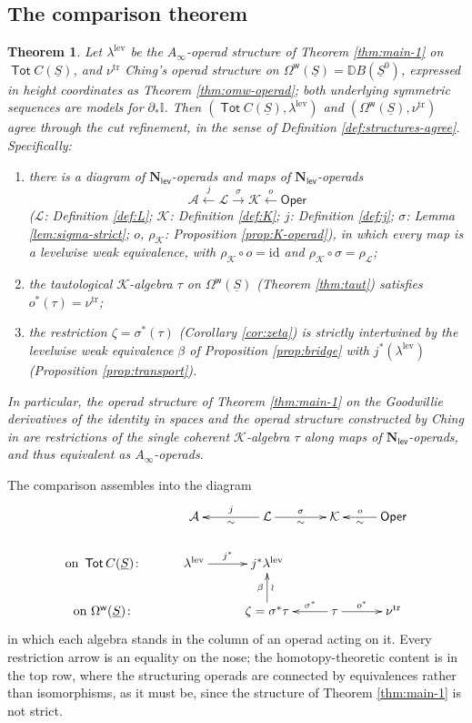 \documentclass[12pt]{amsart}
\newtheorem{theorem}[subsection]{Theorem}
\theoremstyle{definition}
\theoremstyle{remark}
\newcommand{\Tot}{\operatorname{\mathsf{Tot}}}
\newcommand{\Oper}{\mathsf{Oper}}
\newcommand{\id}{\mathrm{id}}
\newcommand{\Id}{\mathbb{I}}
\newcommand{\Nl}{\mathbf{N}_{\mathsf{lev}}}
\newcommand{\uS}{\underline{S}}
\newcommand{\uSz}{\uS^{0}}                       %
\newcommand{\Omw}{\Omega^{\mathsf{w}}}           %
\newcommand{\Kop}{\mathcal{K}}                   %
\newcommand{\Lop}{\mathcal{L}}                   %
\newcommand{\Aop}{\mathcal{A}}                   %
\begin{document}
\subsection{The comparison theorem}\label{sec:main}

\begin{theorem}\label{thm:main}
Let $\lambda^{\mathrm{lev}}$ be the $A_\infty$-operad structure of Theorem \ref{thm:main-1} on $\Tot C(\uS)$, and $\nu^{\mathrm{tr}}$ Ching's operad structure \cite[\S\S 4--8]{Ching-thesis} on $\Omw(\uS) = \mathbb{D}B(\uSz)$, expressed in height coordinates as Theorem \ref{thm:omw-operad}; both underlying symmetric sequences are models for $\partial_*\Id$. Then $(\Tot C(\uS), \lambda^{\mathrm{lev}})$ and $(\Omw(\uS), \nu^{\mathrm{tr}})$ agree through the cut refinement, in the sense of Definition \ref{def:structures-agree}. Specifically:
\begin{enumerate}[label=(\arabic*)]
    \item there is a diagram of $\Nl$-operads and maps of $\Nl$-operads
    \[ \Aop \xleftarrow{\ j\ } \Lop \xrightarrow{\ \sigma\ } \Kop \xleftarrow{\ o\ } \Oper\]
    ($\Lop$: Definition \ref{def:L}; $\Kop$: Definition \ref{def:K}; $j$: Definition \ref{def:j}; $\sigma$: Lemma \ref{lem:sigma-strict}; $o$, $\rho_\Kop$: Proposition \ref{prop:K-operad}), in which every map is a levelwise weak equivalence, with $\rho_\Kop\circ o = \id$ and $\rho_\Kop\circ\sigma = \rho_\Lop$;
    \item the tautological $\Kop$-algebra $\tau$ on $\Omw(\uS)$ (Theorem \ref{thm:taut}) satisfies $o^{*}(\tau) = \nu^{\mathrm{tr}}$;
    \item the restriction $\zeta = \sigma^{*}(\tau)$ (Corollary \ref{cor:zeta}) is strictly intertwined by the levelwise weak equivalence $\beta$ of Proposition \ref{prop:bridge} with $j^{*}(\lambda^{\mathrm{lev}})$ (Proposition \ref{prop:transport}).
\end{enumerate}
In particular, the operad structure of Theorem \ref{thm:main-1} on the Goodwillie derivatives of the identity in spaces and the operad structure constructed by Ching in \cite{Ching-thesis} are restrictions of the single coherent $\Kop$-algebra $\tau$ along maps of $\Nl$-operads, and thus equivalent as $A_\infty$-operads.
\end{theorem}

The comparison assembles into the diagram
\[
\xymatrix@R=2.1em@C=2.6em{
 & \Aop & \Lop \ar[l]_-{j}^-{\sim} \ar[r]^-{\sigma}_-{\sim} & \Kop & \Oper \ar[l]_-{o}^-{\sim} \\
\text{on } \Tot C(\uS)\colon & \lambda^{\mathrm{lev}} \ar[r]^-{j^{*}} & j^{*}\lambda^{\mathrm{lev}} & & \\
\text{on } \Omw(\uS)\colon & & \zeta = \sigma^{*}\tau \ar[u]^-{\beta}_-{\wr} & \tau \ar[l]_-{\sigma^{*}} \ar[r]^-{o^{*}} & \nu^{\mathrm{tr}}
}
\]
in which each algebra stands in the column of an operad acting on it. Every restriction arrow is an equality on the nose; the homotopy-theoretic content is in the top row, where the structuring operads are connected by equivalences rather than isomorphisms, as it must be, since the structure of Theorem \ref{thm:main-1} is not strict.
\end{document}
